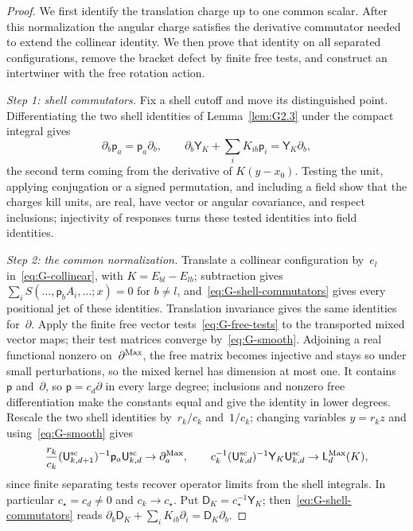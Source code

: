 \begin{proof}
We first identify the translation charge up to one common scalar. After this normalization the angular charge satisfies the derivative commutator needed to extend the collinear identity. We then prove that identity on all separated configurations, remove the bracket defect by finite free tests, and construct an intertwiner with the free rotation action.

\emph{Step 1: shell commutators.} Fix a shell cutoff and move its distinguished point. Differentiating the two shell identities of Lemma~\ref{lem:G2.3} under the compact integral gives
\begin{equation}\label{eq:G-shell-commutators}
\partial_b\mathsf p_a=\mathsf p_a\partial_b,\qquad
\partial_b\mathsf Y_K+\sum_iK_{ib}\mathsf p_i
 =\mathsf Y_K\partial_b,
\end{equation}
the second term coming from the derivative of $K(y-x_0)$. Testing the unit, applying conjugation or a signed permutation, and including a field show that the charges kill units, are real, have vector or angular covariance, and respect inclusions; injectivity of responses turns these tested identities into field identities.

\emph{Step 2: the common normalization.} Translate a collinear configuration by~$e_l$ in~\eqref{eq:G-collinear}, with $K=E_{bl}-E_{lb}$; subtraction gives $\sum_iS(\ldots,\mathsf p_bA_i,\ldots;x)=0$ for $b\ne l$, and~\eqref{eq:G-shell-commutators} gives every positional jet of these identities. Translation invariance gives the same identities for~$\partial$. Apply the finite free vector tests~\eqref{eq:G-free-tests} to the transported mixed vector maps; their test matrices converge by~\eqref{eq:G-smooth}. Adjoining a real functional nonzero on~$\partial^{\rm Max}$, the free matrix becomes injective and stays so under small perturbations, so the mixed kernel has dimension at most one. It contains~$\mathsf p$ and~$\partial$, so $\mathsf p=c_d\partial$ in every large degree; inclusions and nonzero free differentiation make the constants equal and give the identity in lower degrees. Rescale the two shell identities by~$r_k/c_k$ and~$1/c_k$; changing variables $y=r_kz$ and using~\eqref{eq:G-smooth} gives
\begin{equation}\label{eq:G-charge-limits}
\frac{r_k}{c_k}(\mathsf{U}_{k,d+1}^{\mathrm{sc}})^{-1}\mathsf p_a\mathsf{U}_{k,d}^{\mathrm{sc}}
 \to\partial_a^{\rm Max},\qquad
c_k^{-1}(\mathsf{U}_{k,d}^{\mathrm{sc}})^{-1}\mathsf Y_K\mathsf{U}_{k,d}^{\mathrm{sc}}
 \to\mathsf L_d^{\rm Max}(K),
\end{equation}
since finite separating tests recover operator limits from the shell integrals. In particular $c_\star=c_d\ne0$ and $c_k\to c_\star$. Put $\mathsf D_K=c_\star^{-1}\mathsf Y_K$; then~\eqref{eq:G-shell-commutators} reads $\partial_b\mathsf D_K+\sum_iK_{ib}\partial_i=\mathsf D_K\partial_b$.


\end{proof}
